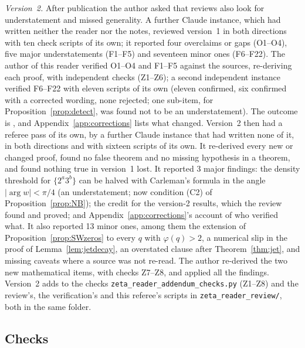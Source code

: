 \emph{Version~2.} After publication the author asked that reviews also look for understatement and missed generality. A further Claude instance, which had written neither the reader nor the notes, reviewed version~1 in both directions with ten check scripts of its own; it reported four overclaims or gaps (O1--O4), five major understatements (F1--F5) and seventeen minor ones (F6--F22). The author of this reader verified O1--O4 and F1--F5 against the sources, re-deriving each proof, with independent checks (Z1--Z6); a second independent instance verified F6--F22 with eleven scripts of its own (eleven confirmed, six confirmed with a corrected wording, none rejected; one sub-item, for Proposition~\ref{prop:detect}, was found not to be an understatement). The outcome is , and Appendix~\ref{app:corrections} lists what changed. Version~2 then had a referee pass of its own, by a further Claude instance that had written none of it, in both directions and with sixteen scripts of its own. It re-derived every new or changed proof, found no false theorem and no missing hypothesis in a theorem, and found nothing true in version~1 lost. It reported 3 major findings: the density threshold for $\{2^a3^b\}$ can be halved with Carleman's formula in the angle $|\arg w|<\pi/4$ (an understatement; now condition (C2) of Proposition~\ref{prop:NB}); the credit for the version-2 results, which the review found and proved; and Appendix~\ref{app:corrections}'s account of who verified what. It also reported 13 minor ones, among them the extension of Proposition~\ref{prop:SWzeros} to every $q$ with $\varphi(q)>2$, a numerical slip in the proof of Lemma~\ref{lem:jetdecay}, an overstated clause after Theorem~\ref{thm:jet}, and missing caveats where a source was not re-read. The author re-derived the two new mathematical items, with checks Z7--Z8, and applied all the findings. Version~2 adds to the checks \texttt{zeta\_reader\_addendum\_checks.py} (Z1--Z8) and the review's, the verification's and this referee's scripts in \texttt{zeta\_reader\_review/}, both in the same folder.

\subsection{Checks}


